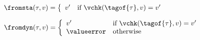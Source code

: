 \begin{flushleft}
\medskip
$\fromsta(\tau, v) = \left\{\begin{array}{l l}
  v' & \mbox{if $\vchk(\tagof{\tau}, v) = v'$}
\end{array}\right.$

\medskip
$\fromdyn(\tau, v) = \left\{\begin{array}{l l}
  v' & \mbox{if $\vchk(\tagof{\tau}, v) = v'$}
\\
  \valueerror & \mbox{otherwise}
\end{array}\right.$


\medskip
{}
\begin{mathpar}










\end{mathpar}

\medskip
{}
\begin{mathpar}




\end{mathpar}
\end{flushleft}
